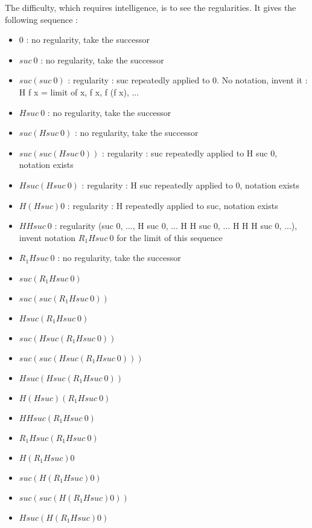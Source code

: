 \documentclass[10pt]{article}
\begin{document}
The difficulty, which requires intelligence, is to see the regularities. It gives the following sequence :

\begin{itemize}
     \setlength{\itemsep}{1pt}
     \setlength{\parskip}{0pt}
     \setlength{\parsep}{0pt}

\item \(    0 \) : no regularity, take the successor
\item \(    suc\ 0 \) : no regularity, take the successor
\item \(    suc (suc\ 0) \) : regularity : suc repeatedly applied to 0. No notation, invent it : H f x = limit of x, f x, f (f x), ... 
\item \(    H suc\ 0 \) : no regularity, take the successor
\item \(    suc (H suc\ 0) \) : no regularity, take the successor
\item \(    suc (suc (H suc\ 0)) \) : regularity : suc repeatedly applied to H suc 0, notation exists
\item \(    H suc (H suc\ 0) \) : regularity : H suc repeatedly applied to 0, notation exists
\item \(    H (H suc) 0 \) : regularity : H repeatedly applied to suc, notation exists
\item \(    H H suc\ 0 \) : regularity (suc 0, ..., H suc 0, ... H H suc 0, ... H H H suc 0, ...), invent notation \( R_1 H suc\ 0 \) for the limit of this sequence 
\item \(    R_1 H suc\ 0 \) : no regularity, take the successor
\item \(    suc (R_1 H suc\ 0) \)
\item \(    suc (suc (R_1 H suc\ 0)) \)
\item \(    H suc (R_1 H suc\ 0) \)
\item \(    suc (H suc (R_1 H suc\ 0)) \)
\item \(    suc (suc (H suc (R_1 H suc\ 0))) \)
\item \(    H suc (H suc (R_1 H suc\ 0)) \)
\item \(    H (H suc) (R_1 H suc\ 0) \)
\item \(    H H suc (R_1 H suc\ 0) \)
\item \(    R_1 H suc (R_1 H suc\ 0) \)
\item \(    H (R_1 H suc) 0 \)
\item \(    suc (H (R_1 H suc) 0) \)
\item \(    suc (suc (H (R_1 H suc) 0)) \)
\item \(    H suc (H (R_1 H suc) 0) \)

\end{itemize}
\end{document}
